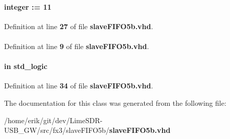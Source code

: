 \paragraph[{socket3\+\_\+wrusedw\+\_\+size}]{ {\bfseries \textcolor{vhdlchar}{ }} {\bfseries \textcolor{comment}{integer}\textcolor{vhdlchar}{ }\textcolor{vhdlchar}{ }\textcolor{vhdlchar}{\+:}\textcolor{vhdlchar}{=}\textcolor{vhdlchar}{ }\textcolor{vhdlchar}{ } \textcolor{vhdldigit}{11} \textcolor{vhdlchar}{ }} \hspace{0.3cm}{\ttfamily [Generic]}}\label{classslaveFIFO5b_a2ebf6055d64fe2b4039968eff27fee4b}


Definition at line {\bf 27} of file {\bf slave\+F\+I\+F\+O5b.\+vhd}.

\paragraph[{std\+\_\+logic\+\_\+1164}]{\hspace{0.3cm}{\ttfamily [Package]}}\label{classslaveFIFO5b_acd03516902501cd1c7296a98e22c6fcb}


Definition at line {\bf 9} of file {\bf slave\+F\+I\+F\+O5b.\+vhd}.

\paragraph[{usb\+\_\+speed}]{ {\bfseries \textcolor{keywordflow}{in}\textcolor{vhdlchar}{ }} {\bfseries \textcolor{comment}{std\+\_\+logic}\textcolor{vhdlchar}{ }} \hspace{0.3cm}{\ttfamily [Port]}}\label{classslaveFIFO5b_a4f24827b8507b0c51581ac61ca8df605}


Definition at line {\bf 34} of file {\bf slave\+F\+I\+F\+O5b.\+vhd}.



The documentation for this class was generated from the following file\+:\begin{DoxyCompactItemize}
\item 
/home/erik/git/dev/\+Lime\+S\+D\+R-\/\+U\+S\+B\+\_\+\+G\+W/src/fx3/slave\+F\+I\+F\+O5b/{\bf slave\+F\+I\+F\+O5b.\+vhd}\end{DoxyCompactItemize}
